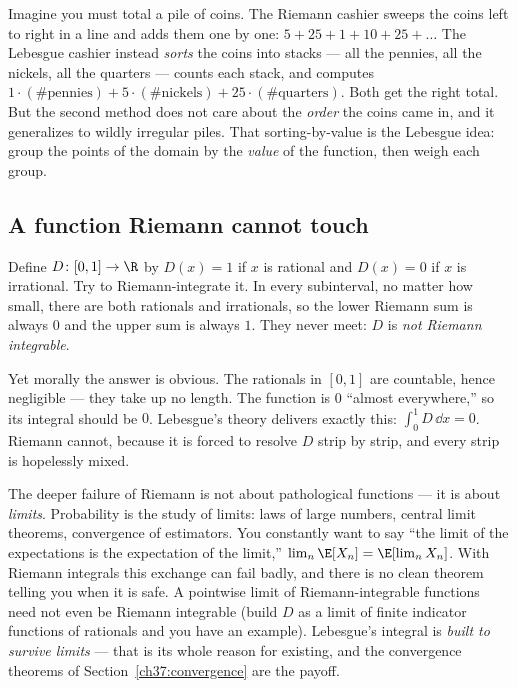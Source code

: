 Imagine you must total a pile of coins. The Riemann cashier sweeps the coins
left to right in a line and adds them one by one: $5 + 25 + 1 + 10 + 25 + \dots$
The Lebesgue cashier instead \emph{sorts} the coins into stacks --- all the
pennies, all the nickels, all the quarters --- counts each stack, and computes
$1\cdot(\text{\# pennies}) + 5\cdot(\text{\# nickels}) + 25\cdot(\text{\#
quarters})$. Both get the right total. But the second method does not care about
the \emph{order} the coins came in, and it generalizes to wildly irregular
piles. That sorting-by-value is the Lebesgue idea: group the points of the
domain by the \emph{value} of the function, then weigh each group.

\subsection{A function Riemann cannot touch}

\begin{example}
\label{ch37:dirichlet}
Define $D\colon[0,1]\to\R$ by $D(x)=1$ if $x$ is rational and $D(x)=0$ if $x$ is
irrational. Try to Riemann-integrate it. In every subinterval, no matter how
small, there are both rationals and irrationals, so the lower Riemann sum is
always $0$ and the upper sum is always $1$. They never meet: $D$ is
\emph{not Riemann integrable}.

Yet morally the answer is obvious. The rationals in $[0,1]$ are countable, hence
negligible --- they take up no length. The function is $0$ ``almost
everywhere,'' so its integral should be $0$. Lebesgue's theory delivers exactly
this: $\int_0^1 D\,\dd x = 0$. Riemann cannot, because it is forced to resolve
$D$ strip by strip, and every strip is hopelessly mixed.
\end{example}

\begin{whybox}
The deeper failure of Riemann is not about pathological functions --- it is
about \emph{limits}. Probability is the study of limits: laws of large numbers,
central limit theorems, convergence of estimators. You constantly want to say
``the limit of the expectations is the expectation of the limit,''
$\lim_n \E[X_n] = \E[\lim_n X_n]$. With Riemann integrals this exchange can fail
badly, and there is no clean theorem telling you when it is safe. A pointwise
limit of Riemann-integrable functions need not even be Riemann integrable (build
$D$ as a limit of finite indicator functions of rationals and you have an
example). Lebesgue's integral is \emph{built to survive limits} --- that is its
whole reason for existing, and the convergence theorems of
Section~\ref{ch37:convergence} are the payoff.
\end{whybox}

